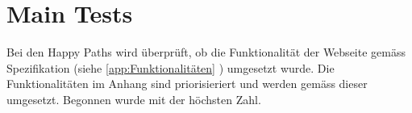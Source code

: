 \section{Main Tests}
Bei den Happy Paths wird überprüft, ob die Funktionalität der Webseite gemäss Spezifikation (siehe \cref{app:Funktionalitäten} ) umgesetzt wurde. Die Funktionalitäten im Anhang sind priorisieriert und werden gemäss dieser umgesetzt. Begonnen wurde mit der höchsten Zahl.







